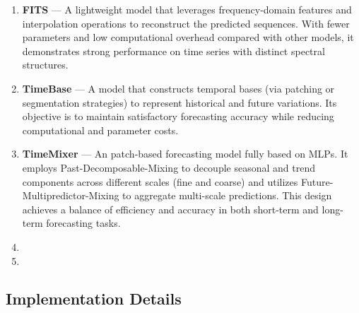 \begin{enumerate}
    \item \textbf{FITS} — A lightweight model that leverages frequency-domain features and interpolation operations to reconstruct the predicted sequences. With fewer parameters and low computational overhead compared with other models, it demonstrates strong performance on time series with distinct spectral structures.

    \item \textbf{TimeBase} — A model that constructs temporal bases (via patching or segmentation strategies) to represent historical and future variations. Its objective is to maintain satisfactory forecasting accuracy while reducing computational and parameter costs.

    \item \textbf{TimeMixer} — An patch-based forecasting model fully based on MLPs. It employs Past-Decomposable-Mixing to decouple seasonal and trend components across different scales (fine and coarse) and utilizes Future-Multipredictor-Mixing to aggregate multi-scale predictions. This design achieves a balance of efficiency and accuracy in both short-term and long-term forecasting tasks.

    \item {}

    \item {}

\end{enumerate}


\subsection{Implementation Details}
\label{sec:dataset_details}

